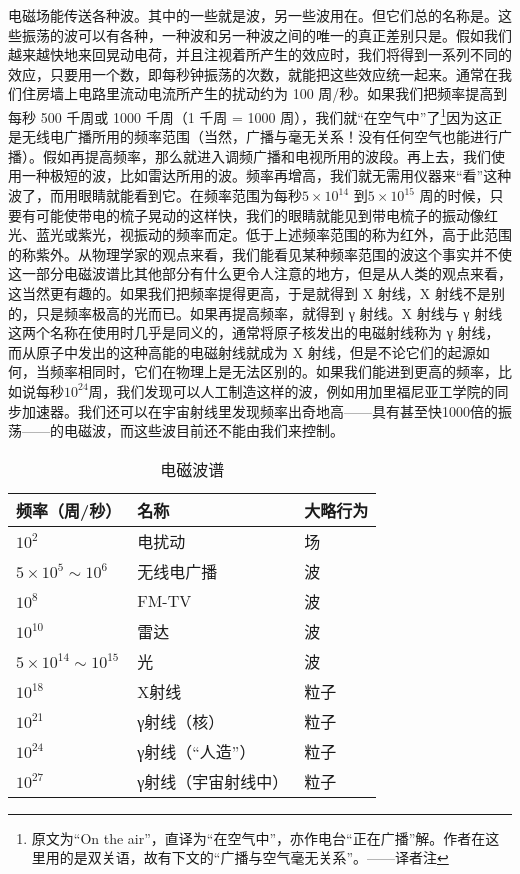 \documentclass[12pt,oneside]{book}
\begin{document}
电磁场能传送各种波。其中的一些就是波，另一些波用在。但它们总的名称是。这些振荡的波可以有各种，一种波和另一种波之间的唯一的真正差别只是。假如我们越来越快地来回晃动电荷，并且注视着所产生的效应时，我们将得到一系列不同的效应，只要用一个数，即每秒钟振荡的次数，就能把这些效应统一起来。通常在我们住房墙上电路里流动电流所产生的扰动约为 100 周/秒。如果我们把频率提高到每秒 500 千周或 1000 千周（1 千周 = 1000 周），我们就“在空气中”了\footnote{原文为“On the air”，直译为“在空气中”，亦作电台“正在广播”解。作者在这里用的是双关语，故有下文的“广播与空气毫无关系”。——译者注}因为这正是无线电广播所用的频率范围（当然，广播与毫无关系！没有任何空气也能进行广播）。假如再提高频率，那么就进入调频广播和电视所用的波段。再上去，我们使用一种极短的波，比如雷达所用的波。频率再增高，我们就无需用仪器来“看”这种波了，而用眼睛就能看到它。在频率范围为每秒$ 5\times10^{14} $  到$ 5\times10^{15}  $ 周的时候，只要有可能使带电的梳子晃动的这样快，我们的眼睛就能见到带电梳子的振动像红光、蓝光或紫光，视振动的频率而定。低于上述频率范围的称为红外，高于此范围的称紫外。从物理学家的观点来看，我们能看见某种频率范围的波这个事实并不使这一部分电磁波谱比其他部分有什么更令人注意的地方，但是从人类的观点来看，这当然更有趣的。如果我们把频率提得更高，于是就得到 X 射线，X 射线不是别的，只是频率极高的光而已。如果再提高频率，就得到 γ 射线。X 射线与 γ 射线这两个名称在使用时几乎是同义的，通常将原子核发出的电磁射线称为 γ 射线，而从原子中发出的这种高能的电磁射线就成为 X 射线，但是不论它们的起源如何，当频率相同时，它们在物理上是无法区别的。如果我们能进到更高的频率，比如说每秒$10^{24}$周，我们发现可以人工制造这样的波，例如用加里福尼亚工学院的同步加速器。我们还可以在宇宙射线里发现频率出奇地高——具有甚至快1000倍的振荡——的电磁波，而这些波目前还不能由我们来控制。
\begin{table}[H]
\centering
\label{tab:电磁波谱}
\caption{电磁波谱}
\medskip 
\begin{tabular}{@{}lll@{}}
\toprule
频率（周/秒）                     & 名称         & 大略行为 \\ \midrule
$10^{2}$                    & 电扰动        & 场    \\
$5\times10^{5}\sim10^{6}$   & 无线电广播      & 波    \\
$10^{8}$                    & FM-TV      & 波    \\
$10^{10}$                   & 雷达         & 波    \\
$5\times10^{14}\sim10^{15}$ & 光          & 波    \\
$10^{18}$                   & X射线        & 粒子   \\
$10^{21}$                   & γ射线（核）     & 粒子   \\
$10^{24}$                   & γ射线（“人造”）  & 粒子   \\
$10^{27}$                   & γ射线（宇宙射线中） & 粒子  \\ \bottomrule
\end{tabular}
\end{table}
\end{document}
